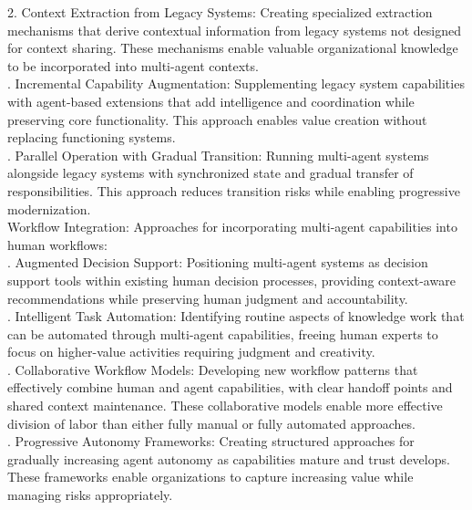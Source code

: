 2. Context Extraction from Legacy Systems: Creating specialized extraction mechanisms that derive contextual information from legacy systems not designed for context sharing. These mechanisms enable valuable organizational knowledge to be incorporated into multi-agent contexts.\\ . Incremental Capability Augmentation: Supplementing legacy system capabilities with agent-based extensions that add intelligence and coordination while preserving core functionality. This approach enables value creation without replacing functioning systems.\\ . Parallel Operation with Gradual Transition: Running multi-agent systems alongside legacy systems with synchronized state and gradual transfer of responsibilities. This approach reduces transition risks while enabling progressive modernization.\\ \newline
Workflow Integration: Approaches for incorporating multi-agent capabilities into human workflows:\\ . Augmented Decision Support: Positioning multi-agent systems as decision support tools within existing human decision processes, providing context-aware recommendations while preserving human judgment and accountability.\\ . Intelligent Task Automation: Identifying routine aspects of knowledge work that can be automated through multi-agent capabilities, freeing human experts to focus on higher-value activities requiring judgment and creativity.\\ . Collaborative Workflow Models: Developing new workflow patterns that effectively combine human and agent capabilities, with clear handoff points and shared context maintenance. These collaborative models enable more effective division of labor than either fully manual or fully automated approaches.\\ . Progressive Autonomy Frameworks: Creating structured approaches for gradually increasing agent autonomy as capabilities mature and trust develops. These frameworks enable organizations to capture increasing value while managing risks appropriately.\\ \newline

